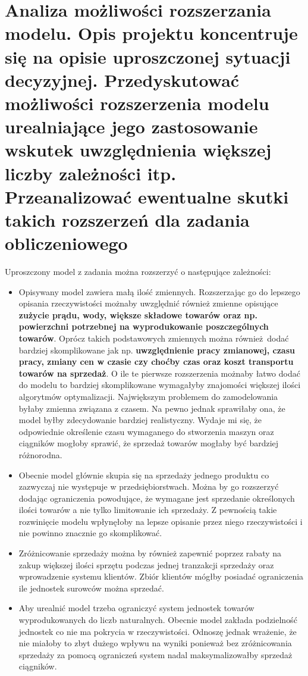 \documentclass{article}
\begin{document}
\section{Analiza  możliwości  rozszerzania  modelu.  Opis  projektu  koncentruje  się  na  opisie uproszczonej  sytuacji  decyzyjnej.  Przedyskutować  możliwości  rozszerzenia  modelu urealniające  jego  zastosowanie  wskutek  uwzględnienia  większej  liczby  zależności  itp. Przeanalizować ewentualne skutki takich rozszerzeń dla zadania obliczeniowego}

Uproszczony model z zadania można rozszerzyć o następujące zależności:

\begin{itemize}
  \item Opisywany model zawiera małą ilość zmiennych. Rozszerzając go do lepszego opisania rzeczywistości możnaby uwzględnić również zmienne opisujące \textbf{zużycie prądu, wody, większe składowe towarów oraz np. powierzchni potrzebnej na wyprodukowanie poszczególnych towarów}. 
    Oprócz takich podstawowych zmiennych można również dodać bardziej skomplikowane jak np. \textbf{uwzględnienie pracy zmianowej, czasu pracy, zmiany cen w czasie czy choćby czas oraz koszt transportu towarów na sprzedaż}. O ile te pierwsze rozszerzenia możnaby łatwo dodać
    do modelu to bardziej skomplikowane wymagałyby znajomości większej ilości algorytmów optymalizacji. Największym problemem do zamodelowania byłaby zmienna związana z czasem. Na pewno jednak sprawiłaby ona, że model byłby zdecydowanie bardziej realistyczny. Wydaje mi się, że
    odpowiednie określenie czasu wymaganego do stworzenia maszyn oraz ciągników mogłoby sprawić, że sprzedaż towarów mogłaby być bardziej różnorodna.
  \item Obecnie model głównie skupia się na sprzedaży jednego produktu co zazwyczaj nie występuje w przedsiębiorstwach. Można by go rozszerzyć dodając ograniczenia powodujące, że wymagane jest sprzedanie określonych ilości towarów a nie tylko limitowanie ich sprzedaży. 
    Z pewnością takie rozwinięcie modelu wpłynęłoby na lepsze opisanie przez niego rzeczywistości i nie powinno znacznie go skomplikować.
  \item Zróżnicowanie sprzedaży można by również zapewnić poprzez rabaty na zakup większej ilości sprzętu podczas jednej tranzakcji sprzedaży oraz wprowadzenie systemu klientów. Zbiór klientów mógłby posiadać ograniczenia ile jednostek surowców można sprzedać.
  \item Aby urealnić model trzeba ograniczyć system jednostek towarów wyprodukowanych do liczb naturalnych. Obecnie model zakłada podzielność jednostek co nie ma pokrycia w rzeczywistości. Odnoszę jednak wrażenie, że nie miałoby to zbyt dużego wpływu na wyniki ponieważ
    bez zróżnicowania sprzedaży za pomocą ograniczeń system nadal maksymalizowałby sprzedaż ciągników.
\end{itemize}
\end{document}
